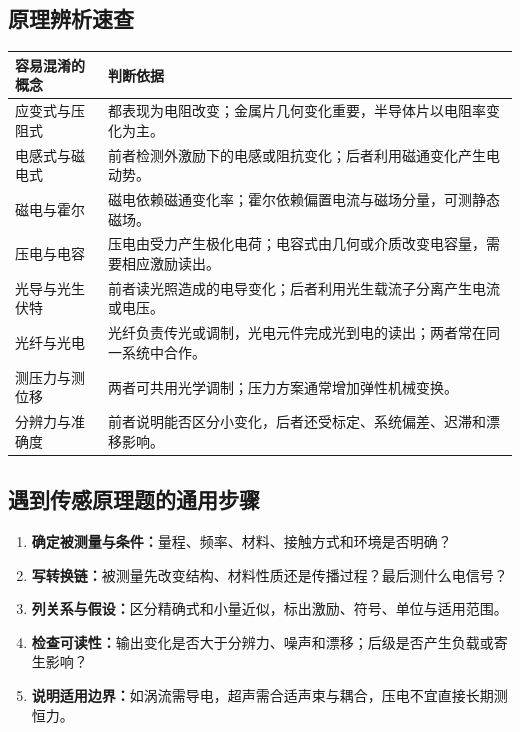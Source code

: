 \subsection*{原理辨析速查}
\begin{table}[H]
\centering\small
\begin{tabularx}{\linewidth}{@{}p{2.7cm} X@{}}
\toprule
容易混淆的概念 & 判断依据 \\
\midrule
应变式与压阻式 & 都表现为电阻改变；金属片几何变化重要，半导体片以电阻率变化为主。 \\
电感式与磁电式 & 前者检测外激励下的电感或阻抗变化；后者利用磁通变化产生电动势。 \\
磁电与霍尔 & 磁电依赖磁通变化率；霍尔依赖偏置电流与磁场分量，可测静态磁场。 \\
压电与电容 & 压电由受力产生极化电荷；电容式由几何或介质改变电容量，需要相应激励读出。 \\
光导与光生伏特 & 前者读光照造成的电导变化；后者利用光生载流子分离产生电流或电压。 \\
光纤与光电 & 光纤负责传光或调制，光电元件完成光到电的读出；两者常在同一系统中合作。 \\
测压力与测位移 & 两者可共用光学调制；压力方案通常增加弹性机械变换。 \\
分辨力与准确度 & 前者说明能否区分小变化，后者还受标定、系统偏差、迟滞和漂移影响。 \\
\bottomrule
\end{tabularx}
\end{table}

\subsection*{遇到传感原理题的通用步骤}
\begin{enumerate}
\item \textbf{确定被测量与条件：}量程、频率、材料、接触方式和环境是否明确？
\item \textbf{写转换链：}被测量先改变结构、材料性质还是传播过程？最后测什么电信号？
\item \textbf{列关系与假设：}区分精确式和小量近似，标出激励、符号、单位与适用范围。
\item \textbf{检查可读性：}输出变化是否大于分辨力、噪声和漂移；后级是否产生负载或寄生影响？
\item \textbf{说明适用边界：}如涡流需导电，超声需合适声束与耦合，压电不宜直接长期测恒力。
\end{enumerate}

